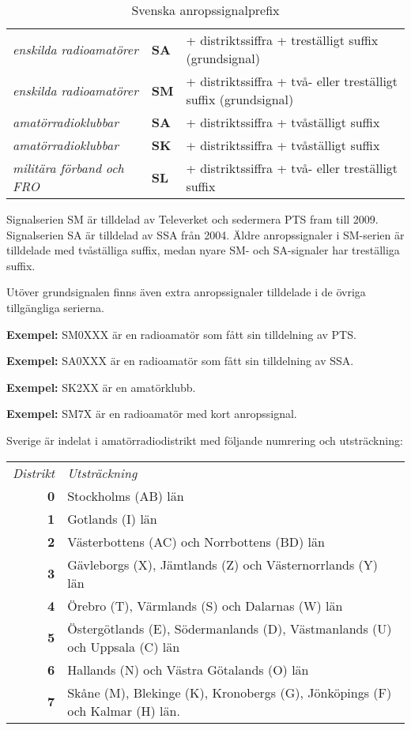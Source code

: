 \begin{table*}[h]
  \begin{center}
    \begin{tabular}{lll}
      \emph{enskilda radioamatörer} & \textbf{SA} &
      + distriktssiffra + treställigt suffix (grundsignal) \\
      \emph{enskilda radioamatörer} & \textbf{SM} &
      + distriktssiffra + två- eller treställigt suffix (grundsignal) \\
      \emph{amatörradioklubbar} & \textbf{SA} &
      + distriktssiffra + tvåställigt suffix \\
      \emph{amatörradioklubbar} & \textbf{SK} &
      + distriktssiffra + tvåställigt suffix \\
      \emph{militära förband och FRO} & \textbf{SL} &
      + distriktssiffra + två- eller treställigt suffix \\
    \end{tabular}
    \caption{Svenska anropssignalprefix}
    \label{tab:seprefix}
  \end{center}
\end{table*}

Signalserien SM är tilldelad av Televerket och sedermera PTS fram till 2009.
Signalserien SA är tilldelad av SSA från 2004.
Äldre anropssignaler i SM-serien är tilldelade med tvåställiga suffix, medan
nyare SM- och SA-signaler har treställiga suffix.

Utöver grundsignalen finns även extra anropssignaler tilldelade i de övriga tillgängliga serierna.

\textbf{Exempel:} SM0XXX är en radioamatör som fått sin tilldelning av PTS.

\textbf{Exempel:} SA0XXX är en radioamatör som fått sin tilldelning av SSA.

\textbf{Exempel:} SK2XX är en amatörklubb.

\textbf{Exempel:} SM7X är en radioamatör med kort anropssignal.

Sverige är indelat i amatörradiodistrikt med följande numrering och
utsträckning:

\begin{tabular}{rp{6cm}}
\emph{Distrikt} & \emph{Utsträckning} \\
\textbf{0} & Stockholms (AB) län \\
\textbf{1} & Gotlands (I) län \\
\textbf{2} & Västerbottens (AC) och Norrbottens (BD) län \\
\textbf{3} & Gävleborgs (X), Jämtlands (Z) och Västernorrlands (Y) län \\
\textbf{4} & Örebro (T), Värmlands (S) och Dalarnas (W) län \\
\textbf{5} & Östergötlands (E), Södermanlands (D), Västmanlands (U) och Uppsala (C) län\\
\textbf{6} & Hallands (N) och Västra Götalands (O) län \\
\textbf{7} & Skåne (M), Blekinge (K), Kronobergs (G), Jönköpings (F) och Kalmar (H) län.\\
\end{tabular}

